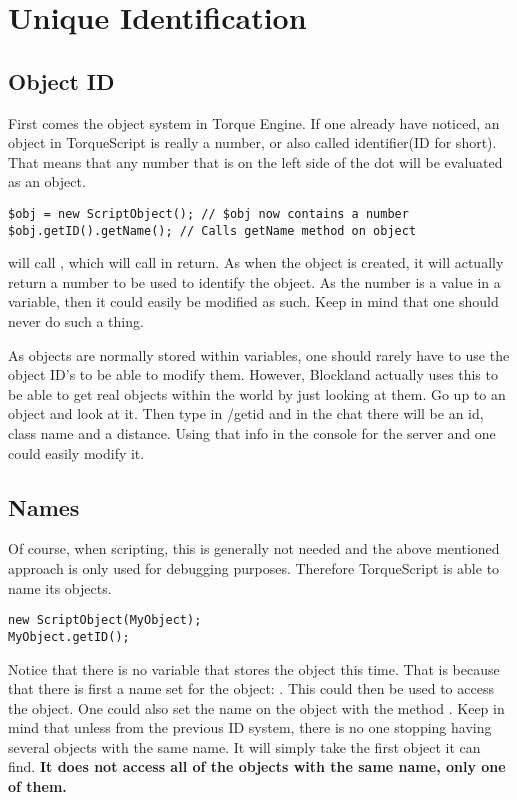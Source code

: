 \section{Unique Identification}

\subsection{Object ID}

First comes the object system in Torque Engine. If one already have noticed, an object in TorqueScript is really a number, or also called identifier(ID for short). That means that any number that is on the left side of the dot will be evaluated as an object.

\begin{lstlisting}[style=ts]
$obj = new ScriptObject(); // $obj now contains a number
$obj.getID().getName(); // Calls getName method on object
\end{lstlisting}

 will call , which will call  in return. As when the object is created, it will actually return a number to be used to identify the object. As the number is a value in a variable, then it could easily be modified as such. Keep in mind that one should never do such a thing.

As objects are normally stored within variables, one should rarely have to use the object ID’s to be able to modify them. However, Blockland actually uses this to be able to get real objects within the world by just looking at them. Go up to an object and look at it. Then type in /getid and in the chat there will be an id, class name and a distance. Using that info in the console for the server and one could easily modify it.

\subsection{Names}

Of course, when scripting, this is generally not needed and the above mentioned approach is only used for debugging purposes. Therefore TorqueScript is able to name its objects.

\begin{lstlisting}[style=ts]
new ScriptObject(MyObject);
MyObject.getID();
\end{lstlisting}

Notice that there is no variable that stores the object this time. That is because that there is first a name set for the object: . This could then be used to access the object. One could also set the name on the object with the method . Keep in mind that unless from the previous ID system, there is no one stopping having several objects with the same name. It will simply take the first object it can find. \textbf{It does not access all of the objects with the same name, only one of them.}

